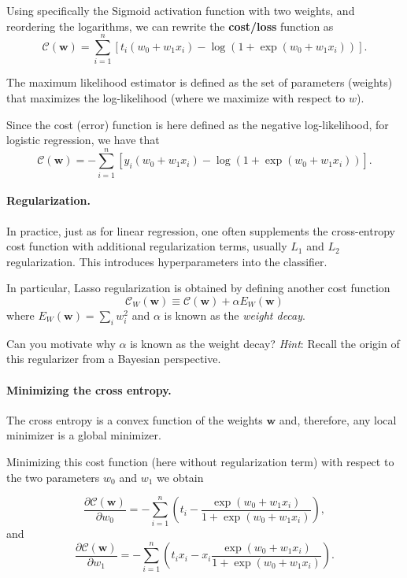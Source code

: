 \documentclass[%
oneside,                 %
final,                   %
10pt]{article}
\newenvironment{question_mdfboxadmon}[1][]{
\begin{question_mdfboxmdframed}[frametitle=#1]
}
{
\end{question_mdfboxmdframed}
}
\begin{document}
Using specifically the Sigmoid activation function with two weights, and reordering the logarithms, we can rewrite the \textbf{cost/loss} function as
\[
\mathcal{C}(\boldsymbol{w}) = \sum_{i=1}^n  \left[ t_i(w_0+w_1 x_i) -\log{(1+\exp{(w_0+w_1x_i)})} \right].
\]

The maximum likelihood estimator is defined as the set of parameters (weights) that maximizes the log-likelihood (where we maximize with respect to $w$).

Since the cost (error) function is here defined as the negative log-likelihood, for logistic regression, we have that
\[
\mathcal{C}(\boldsymbol{w})=-\sum_{i=1}^n  \left[ y_i (w_0+w_1x_i) -\log{ \left( 1+\exp{(w_0+w_1x_i)} \right) } \right].
\]

\paragraph{Regularization.}
In practice, just as for linear regression, one often supplements the cross-entropy cost function with additional regularization terms, usually $L_1$ and $L_2$ regularization. This introduces hyperparameters into the classifier.

In particular, Lasso regularization is obtained by defining another cost function
\[
\mathcal{C}_W (\boldsymbol{w}) \equiv \mathcal{C} (\boldsymbol{w}) + \alpha E_W (\boldsymbol{w})
\]
where $E_W (\boldsymbol{w}) = \sum_i w_i^2$ and $\alpha$ is known as the \emph{weight decay}.


\begin{question_mdfboxadmon}[Question]
Can you motivate why $\alpha$ is known as the weight decay? \emph{Hint}: Recall the origin of this regularizer from a Bayesian perspective.
\end{question_mdfboxadmon} %




\paragraph{Minimizing the cross entropy.}
The cross entropy is a convex function of the weights $\boldsymbol{w}$ and,
therefore, any local minimizer is a global minimizer. 


Minimizing this cost function (here without regularization term) with respect to the two parameters $w_0$ and $w_1$ we obtain

\[
\frac{\partial \mathcal{C}(\boldsymbol{w})}{\partial w_0} = -\sum_{i=1}^n  \left(t_i -\frac{\exp{(w_0+w_1x_i)}}{1+\exp{(w_0+w_1x_i)}}\right),
\]
and 
\[
\frac{\partial \mathcal{C}(\boldsymbol{w})}{\partial w_1} = -\sum_{i=1}^n  \left(t_i x_i -x_i\frac{\exp{(w_0+w_1x_i)}}{1+\exp{(w_0+w_1x_i)}}\right).
\]
\end{document}
